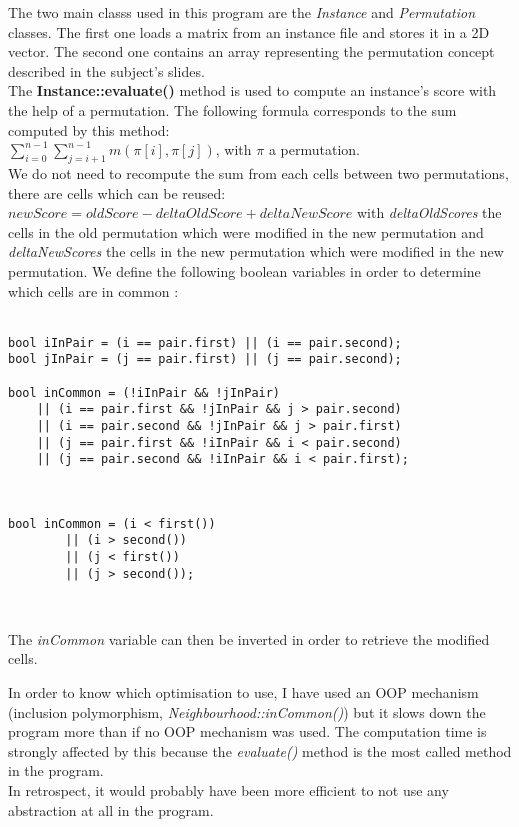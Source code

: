 The two main classs used in this program are the \emph{Instance} and
\emph{Permutation} classes. The first one loads a matrix from an instance file
and stores it in a 2D vector. The second one contains an array representing the
permutation concept described in the subject's slides.\\

The \textbf{Instance::evaluate()} method is used to compute an instance's score
with the help of a permutation. The following formula corresponds to the sum
computed by this method:\\
$\sum_{i=0}^{n-1} \sum_{j=i+1}^{n-1} m(\pi[i], \pi[j])$, with $\pi$ a permutation.\\

We do not need to recompute the sum from each cells between two permutations,
there are cells which can be reused: $newScore = oldScore - deltaOldScore + deltaNewScore$
with \emph{deltaOldScores} the cells in the old permutation which were modified
in the new permutation and \emph{deltaNewScores} the cells in the new permutation
which were modified in the new permutation. We define the following boolean
variables in order to determine which cells are in common :\\\\

\begin{lstlisting}[caption="Cells in common for transpose \& exchange neighbourhoods"]
bool iInPair = (i == pair.first) || (i == pair.second);
bool jInPair = (j == pair.first) || (j == pair.second);

bool inCommon = (!iInPair && !jInPair)
    || (i == pair.first && !jInPair && j > pair.second)
    || (i == pair.second && !jInPair && j > pair.first)
    || (j == pair.first && !iInPair && i < pair.second)
    || (j == pair.second && !iInPair && i < pair.first);
\end{lstlisting}
\

\begin{lstlisting}[caption="Cells in common for insert neighbourhoods"]
    bool inCommon = (i < first())
        || (i > second())
        || (j < first())
        || (j > second());
\end{lstlisting}
\

\noindent The \emph{inCommon} variable can then be inverted in order to retrieve the
modified cells.\\

\begin{frameurgent}
	In order to know which optimisation to use, I have used an OOP mechanism
	(inclusion polymorphism, \emph{Neighbourhood::inCommon()}) but it slows
	down the program more than if no OOP mechanism was used. The computation
	time is strongly affected by this because the \emph{evaluate()} method is
	the most called method in the program.\\
	
	\noindent In retrospect, it would probably have been more efficient to not use any
	abstraction at all in the program.
\end{frameurgent}

